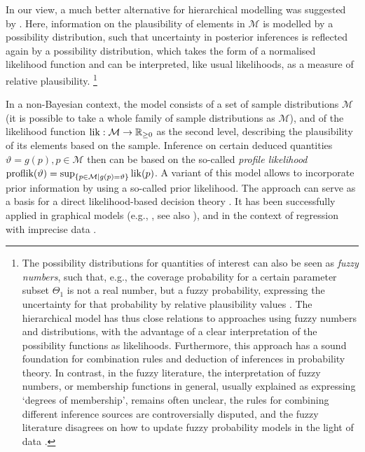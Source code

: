 In our view, a much better alternative for hierarchical modelling was suggested by \textcite{2008:cattaneo}.
Here, information on the plausibility of elements in $\mathcal{M}$ is modelled
by a possibility distribution, such that uncertainty in posterior inferences is reflected
again by a possibility distribution, which takes the form of a normalised likelihood function
and can be interpreted, like usual likelihoods, as a measure of relative plausibility.%
\footnote{The possibility distributions for quantities of interest can also be seen
as \emph{fuzzy numbers}, such that, e.g.,
the coverage probability for a certain parameter subset $\Theta_1$ is not a real number,
but a fuzzy probability, expressing the uncertainty for that probability by relative plausibility values \parencite{2008:cattaneo}.
The hierarchical model has thus close relations to approaches using fuzzy numbers and distributions,
with the advantage of a clear interpretation of the possibility functions as likelihoods.
Furthermore, this approach has a sound foundation for combination rules and deduction of inferences in probability theory.
In contrast, in the fuzzy literature, the interpretation of fuzzy numbers, or membership functions in general,
usually explained as expressing `degrees of membership', remains often unclear, %
the rules for combining different inference sources are controversially disputed,
and the fuzzy literature disagrees on how to update fuzzy probability models in the light of data
\parencite[\S 3]{2008:cattaneo}.}

In a non-Bayesian context, the model consists of a set of sample distributions $\mathcal{M}$
(it is possible to take a whole family of sample distributions as $\mathcal{M}$),
and of the likelihood function $\operatorname{lik}: \mathcal{M} \to \mathbb{R}_{\ge 0}$ as the second level,
describing the plausibility of its elements based on the sample.
Inference on certain deduced quantities $\vartheta=g\left(p\right), p \in \mathcal{M}$
then can be based on the so-called \emph{profile likelihood}
$\text{proflik}(\vartheta) = \sup_{\{p \in \mathcal{M} \mid g(p)=\vartheta\}} \operatorname{lik}(p)$.
A variant of this model allows to incorporate prior information by using a so-called prior likelihood.
The approach can serve as a basis for a direct likelihood-based decision theory \parencite{2007a:cattaneo, 2012:cattaneo-technicalRep}.
It has been successfully applied in graphical models (e.g., \cite{2011:4:isipta},
see also \cite[\S 4.3]{itip-classification}), and in the context of regression with imprecise data
\parencite{2012:cattaneo-wiencierz}.

